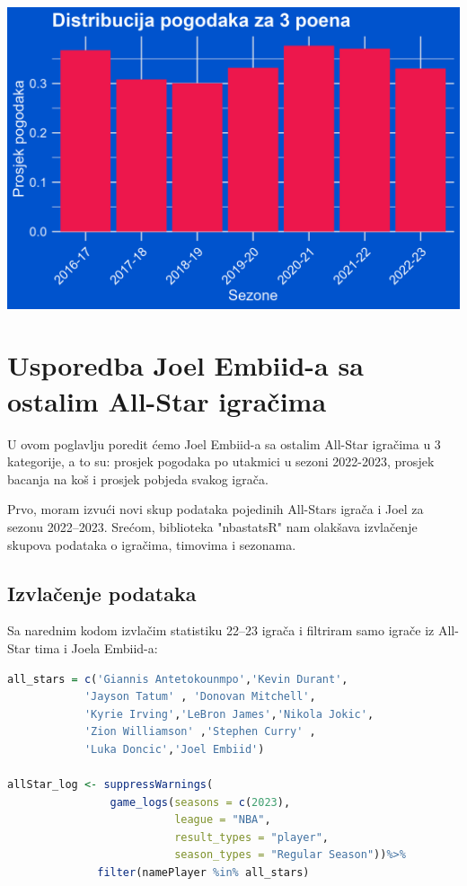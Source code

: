 \documentclass[letterpaper,11pt,leqno]{article}
\begin{document}
\begin{center}
    \includegraphics{DistribucijaTrica2.png}
\end{center}


\section{Usporedba Joel Embiid-a sa ostalim All-Star igračima}\label{s:math}

U ovom poglavlju poredit ćemo Joel Embiid-a sa ostalim All-Star igračima u 3 kategorije, a to su: prosjek pogodaka po utakmici u sezoni 2022-2023, prosjek bacanja na koš i prosjek pobjeda svakog igrača.

Prvo, moram izvući novi skup podataka pojedinih All-Stars igrača i Joel za sezonu 2022–2023. Srećom, biblioteka "nbastatsR" nam olakšava izvlačenje skupova podataka o igračima, timovima i sezonama.

\subsection{Izvlačenje podataka} 

Sa narednim kodom izvlačim statistiku 22–23 igrača i filtriram samo igrače iz All-Star tima i Joela Embiid-a:

\begin{lstlisting}[language=R]
all_stars = c('Giannis Antetokounmpo','Kevin Durant', 
            'Jayson Tatum' , 'Donovan Mitchell',
            'Kyrie Irving','LeBron James','Nikola Jokic',   
            'Zion Williamson' ,'Stephen Curry' , 
            'Luka Doncic','Joel Embiid')  

allStar_log <- suppressWarnings(
                game_logs(seasons = c(2023),
                          league = "NBA", 
                          result_types = "player", 
                          season_types = "Regular Season"))%>% 
              filter(namePlayer %in% all_stars)
\end{lstlisting}
\end{document}
